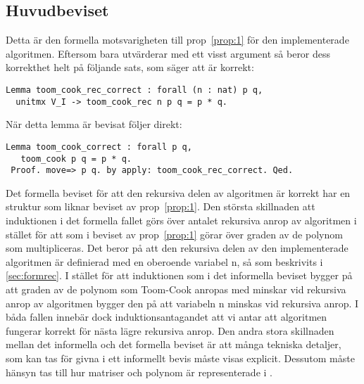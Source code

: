 \subsection{Huvudbeviset}
Detta är den formella motsvarigheten till prop~\ref{prop:1} för den
implementerade algoritmen. Eftersom  bara utvärderar
 med ett visst argument så beror dess korrekthet helt på
följande sats, som säger att  är korrekt:
\begin{lstlisting}
Lemma toom_cook_rec_correct : forall (n : nat) p q,
  unitmx V_I -> toom_cook_rec n p q = p * q.
\end{lstlisting}
När detta lemma är bevisat följer  direkt:
\begin{lstlisting}
Lemma toom_cook_correct : forall p q,
   toom_cook p q = p * q.
 Proof. move=> p q. by apply: toom_cook_rec_correct. Qed.
\end{lstlisting}
Det formella beviset för att den rekursiva delen av algoritmen är korrekt har
en struktur som liknar beviset av prop~\ref{prop:1}.
Den största skillnaden att induktionen i det formella fallet görs över antalet
rekursiva anrop av algoritmen i stället för att som i beviset av
prop~\ref{prop:1} görar över graden av de polynom som multipliceras. Det beror
på att den rekursiva delen av den implementerade algoritmen 
är definierad med en oberoende variabel n, så som beskrivits i
\ref{sec:formrec}. I stället för att induktionen som i det informella
beviset bygger på att graden av de polynom som Toom-Cook anropas med minskar
vid rekursiva anrop av algoritmen bygger den på att variabeln n minskas vid
rekursiva anrop. I båda fallen innebär dock induktionsantagandet att vi antar
att algoritmen fungerar korrekt för nästa lägre rekursiva anrop.
Den andra stora skillnaden mellan det informella och det formella beviset är
att många tekniska detaljer, som kan tas för givna i ett informellt bevis måste
visas explicit. Dessutom måste hänsyn tas till hur matriser och polynom är
representerade i \ssr{}.

